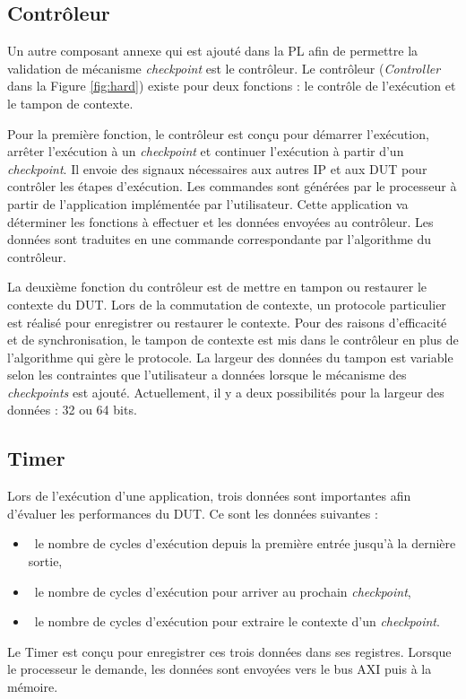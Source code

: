 \subsection{Contrôleur}
Un autre composant annexe qui est ajouté dans la PL afin de permettre la validation de mécanisme \emph{checkpoint} est le contrôleur.
Le contrôleur (\emph{Controller} dans la Figure \ref{fig:hard}) existe pour deux fonctions : le contrôle
de l'exécution et le tampon de contexte.

Pour la première fonction, le contrôleur est conçu pour démarrer l'exécution, arrêter l'exécution à un
\emph{checkpoint} et continuer l'exécution à partir d'un \emph{checkpoint}. 
Il envoie des signaux nécessaires aux autres IP et aux DUT pour contrôler les étapes d'exécution.
Les commandes sont générées par le processeur à partir de l'application implémentée par l'utilisateur. Cette application va déterminer
les fonctions à effectuer et les données envoyées au contrôleur. Les données sont traduites en une commande
correspondante par l'algorithme du contrôleur.

La deuxième fonction du contrôleur est de mettre en tampon ou restaurer le contexte du DUT.
Lors de la commutation de contexte, un protocole particulier est réalisé pour enregistrer ou restaurer le contexte.
Pour des raisons d'efficacité et de synchronisation, le tampon de contexte est mis dans le contrôleur en plus de l'algorithme
qui gère le protocole. La largeur des données du tampon est variable selon les contraintes que l'utilisateur a données
lorsque le mécanisme des \emph{checkpoints} est ajouté.
Actuellement, il y a deux possibilités pour la largeur des données : 32 ou 64 bits.

\subsection{Timer}
\label{subsec:timer}
Lors de l'exécution d'une application, trois données sont importantes afin d'évaluer les performances
du DUT. Ce sont les données suivantes :
\begin{itemize}
	\item\ le nombre de cycles d'exécution depuis la première entrée jusqu'à la dernière sortie,
	\item\ le nombre de cycles d'exécution pour arriver au prochain \emph{checkpoint},
	\item\ le nombre de cycles d'exécution pour extraire le contexte d'un \emph{checkpoint}.
\end{itemize}
Le Timer est conçu pour enregistrer ces trois données dans ses registres. Lorsque le processeur le demande,
les données sont envoyées vers le bus AXI puis à la mémoire.

